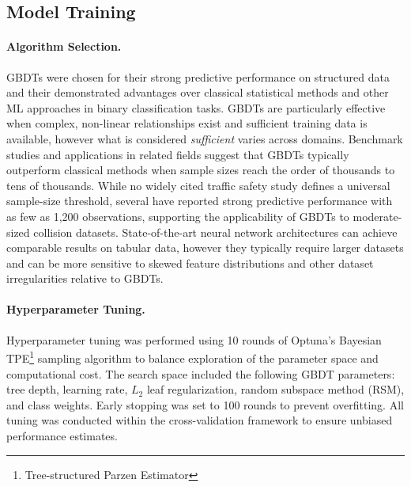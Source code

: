 \documentclass{article}
\begin{document}
\subsection{Model Training}
\paragraph{Algorithm Selection.}
GBDTs were chosen for their strong predictive performance on structured data and their demonstrated advantages over classical statistical methods and other ML approaches in binary classification tasks.\cite{MLbenchmark, schmitt2022deeplearningvsgradient,Henckaerts2021-vo, Mulugeta2023-or} GBDTs are particularly effective when complex, non-linear relationships exist and sufficient training data is available, however what is considered \textit{sufficient} varies across domains. Benchmark studies and applications in related fields suggest that GBDTs typically outperform classical methods when sample sizes reach the order of thousands to tens of thousands.\cite{Alabi2025-ct, Seto2022-hf, Silvey2024SampleSize} While no widely cited traffic safety study defines a universal sample-size threshold, several have reported strong predictive performance with as few as 1,200 observations, supporting the applicability of GBDTs to moderate-sized collision datasets.\cite{systems14010104, Mengistu2025EthiopiaSeverity} State-of-the-art neural network architectures can achieve comparable results on tabular data, however they typically require larger datasets and can be more sensitive to skewed feature distributions and other dataset irregularities relative to GBDTs.\cite{mcelfresh2024neuralnetsoutperformboosted}

\paragraph{Hyperparameter Tuning.}
Hyperparameter tuning was performed using 10 rounds of Optuna's Bayesian TPE\footnote{Tree-structured Parzen Estimator} sampling algorithm to balance exploration of the parameter space and computational cost.\cite{akiba2019optunanextgenerationhyperparameteroptimization} The search space included the following GBDT parameters: tree depth, learning rate, $L_2$ leaf regularization, random subspace method (RSM), and class weights. Early stopping was set to 100 rounds to prevent overfitting. All tuning was conducted within the cross-validation framework to ensure unbiased performance estimates.
\end{document}
